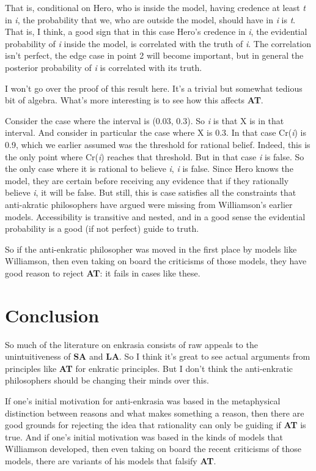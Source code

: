 \documentclass[
  11pt,
  letterpaper,
  DIV=11,
  numbers=noendperiod,
  twoside]{scrartcl}
\begin{document}
That is, conditional on Hero, who is inside the model, having credence
at least \emph{t} in \emph{i}, the probability that we, who are outside
the model, should have in \emph{i} is \emph{t}. That is, I think, a good
sign that in this case Hero's credence in \emph{i}, the evidential
probability of \emph{i} inside the model, is correlated with the truth
of \emph{i}. The correlation isn't perfect, the edge case in point 2
will become important, but in general the posterior probability of
\emph{i} is correlated with its truth.

I won't go over the proof of this result here. It's a trivial but
somewhat tedious bit of algebra. What's more interesting is to see how
this affects \textbf{AT}.

Consider the case where the interval is (0.03, 0.3). So \emph{i} is that
X is in that interval. And consider in particular the case where X is
0.3. In that case Cr(\emph{i}) is 0.9, which we earlier assumed was the
threshold for rational belief. Indeed, this is the only point where
Cr(\emph{i}) reaches that threshold. But in that case \emph{i} is false.
So the only case where it is rational to believe \emph{i}, \emph{i} is
false. Since Hero knows the model, they are certain before receiving any
evidence that if they rationally believe \emph{i}, it will be false. But
still, this is case satisfies all the constraints that anti-akratic
philosophers have argued were missing from Williamson's earlier models.
Accessibility is transitive and nested, and in a good sense the
evidential probability is a good (if not perfect) guide to truth.

So if the anti-enkratic philosopher was moved in the first place by
models like Williamson, then even taking on board the criticisms of
those models, they have good reason to reject \textbf{AT}: it fails in
cases like these.

\section{Conclusion}\label{sec-conclusions}

So much of the literature on enkrasia consists of raw appeals to the
unintuitiveness of \textbf{SA} and \textbf{LA}. So I think it's great to
see actual arguments from principles like \textbf{AT} for enkratic
principles. But I don't think the anti-enkratic philosophers should be
changing their minds over this.

If one's initial motivation for anti-enkrasia was based in the
metaphysical distinction between reasons and what makes something a
reason, then there are good grounds for rejecting the idea that
rationality can only be guiding if \textbf{AT} is true. And if one's
initial motivation was based in the kinds of models that Williamson
developed, then even taking on board the recent criticisms of those
models, there are variants of his models that falsify \textbf{AT}.
\end{document}
